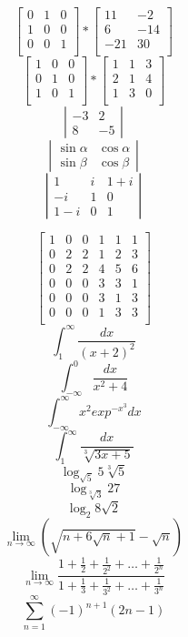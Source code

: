 \documentclass[11pt,a4paper]{article}
\begin{document}
\newline
$$
\left[ \begin{array}{ccc}
0 & 1 & 0 \\
1 & 0 & 0 \\
0 & 0 & 1 \\
\end{array} \right]
*
\left[ \begin{array}{cc}
11 & -2 \\
6 & -14 \\
-21 & 30 \\
\end{array} \right]
$$
\newline
$$
\left[ \begin{array}{ccc}
1 & 0 & 0 \\
0 & 1 & 0 \\
1 & 0 & 1 \\
\end{array} \right]
*
\left[ \begin{array}{ccc}
1 & 1 & 3 \\
2 & 1 & 4 \\
1 & 3 & 0 \\
\end{array} \right]
$$
\newline
$$
\left|
\begin{array}{rr}
-3 & 2\\
8 & -5
\end{array}
\right|
$$
\newline
$$
\left|
\begin{array}{cc}
\sin \alpha & \cos \alpha\\
\sin \beta & \cos \beta
\end{array}
\right|
$$
\newline
$$
\left|
\begin{array}{ccc}
1 & i & 1+i\\
-i & 1 & 0\\
1-i & 0 & 1
\end{array}
\right|
$$

$$ \left[
\begin{array}{c|cc|ccc}
1 & 0 & 0 & 1 & 1 & 1  \\
\hline
0 & 2 & 2 & 1 & 2 & 3\\
0 & 2 & 2 & 4 & 5 & 6 \\
\hline
0 & 0 & 0 & 3 & 3 & 1\\
0 & 0 & 0 & 3 & 1 & 3\\
0 & 0 & 0 & 1 & 3 & 3\\
\end{array} \right] $$
\newline
$$ \int_{1}^{\infty}\frac{dx}{(x+2)^2}$$
$$ \int_{-\infty}^{0}\frac{dx}{x^2+4}$$
$$ \int_{-\infty}^{\infty}x^2 exp^{-x^3}dx $$
$$ \int_{1}^{\infty}\frac{dx}{\sqrt[3]{3x+5}}$$
\newline
$$ \log_{\sqrt{5}}5\sqrt[3]{5} $$
$$ \log_{\sqrt[3]{3}}27 $$
$$ \log_{2}8\sqrt{2} $$
\newline
$$ \lim_{n\to\infty}\left( \sqrt{n+6\sqrt{n}+1}-\sqrt{n} \right) $$
$$ \lim_{n\to\infty} \frac{1+\frac{1}{2}+\frac{1}{2^2}+\ldots+\frac{1}{2^n}}{1+\frac{1}{3}+\frac{1}{3^2}+\ldots+\frac{1}{3^n}} $$
\newline
$$
\sum_{n=1}^{\infty}{(-1)^{n+1}}(2n-1)
$$
\end{document}
